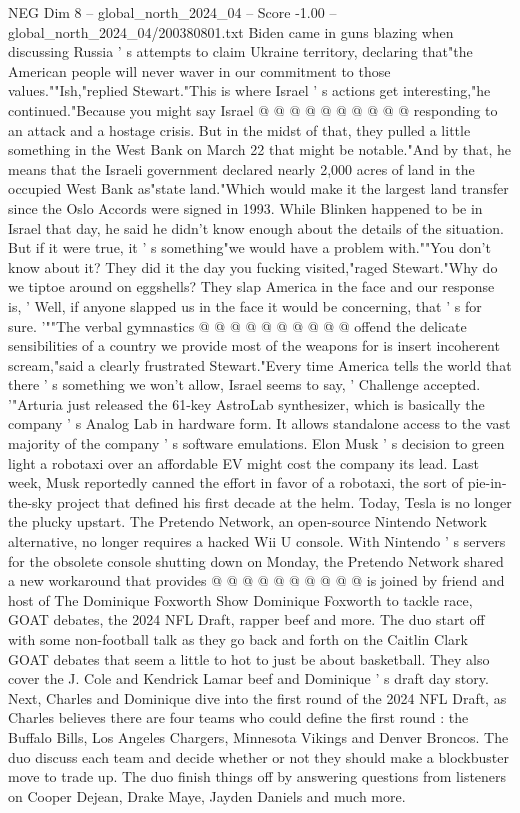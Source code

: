 \begin{textsample}{NEG Dim 8 – global\_north\_2024\_04 – Score -1.00 – global\_north\_2024\_04/200380801.txt}
Biden came in guns blazing when discussing Russia ' s attempts to claim Ukraine territory, declaring that"the American people will never waver in our commitment to those values.""Ish,"replied Stewart."This is where Israel ' s actions get interesting,"he continued."Because you might say Israel @ @ @ @ @ @ @ @ @ @ responding to an attack and a hostage crisis.
But in the midst of that, they pulled a little something in the West Bank on March 22 that might be notable."And by that, he means that the Israeli government declared nearly 2,000 acres of land in the occupied West Bank as"state land."Which would make it the largest land transfer since the Oslo Accords were signed in 1993.
While Blinken happened to be in Israel that day, he said he didn't know enough about the details of the situation.
But if it were true, it ' s something"we would have a problem with.""You don't know about it?
They did it the day you fucking visited,"raged Stewart."Why do we tiptoe around on eggshells?
They slap America in the face and our response is, ' Well, if anyone slapped us in the face it would be concerning, that ' s for sure. '""The verbal gymnastics @ @ @ @ @ @ @ @ @ @ offend the delicate sensibilities of a country we provide most of the weapons for is insert incoherent scream,"said a clearly frustrated Stewart."Every time America tells the world that there ' s something we won't allow, Israel seems to say, ' Challenge accepted. '"Arturia just released the 61-key AstroLab synthesizer, which is basically the company ' s Analog Lab in hardware form.
It allows standalone access to the vast majority of the company ' s software emulations.
Elon Musk ' s decision to green light a robotaxi over an affordable EV might cost the company its lead.
Last week, Musk reportedly canned the effort in favor of a robotaxi, the sort of pie-in-the-sky project that defined his first decade at the helm.
Today, Tesla is no longer the plucky upstart.
The Pretendo Network, an open-source Nintendo Network alternative, no longer requires a hacked Wii U console.
With Nintendo ' s servers for the obsolete console shutting down on Monday, the Pretendo Network shared a new workaround that provides @ @ @ @ @ @ @ @ @ @ is joined by friend and host of The Dominique Foxworth Show Dominique Foxworth to tackle race, GOAT debates, the 2024 NFL Draft, rapper beef and more.
The duo start off with some non-football talk as they go back and forth on the Caitlin Clark GOAT debates that seem a little to hot to just be about basketball.
They also cover the J.
Cole and Kendrick Lamar beef and Dominique ' s draft day story.
Next, Charles and Dominique dive into the first round of the 2024 NFL Draft, as Charles believes there are four teams who could define the first round : the Buffalo Bills, Los Angeles Chargers, Minnesota Vikings and Denver Broncos.
The duo discuss each team and decide whether or not they should make a blockbuster move to trade up.
The duo finish things off by answering questions from listeners on Cooper Dejean, Drake Maye, Jayden Daniels and much more.

\end{textsample}
